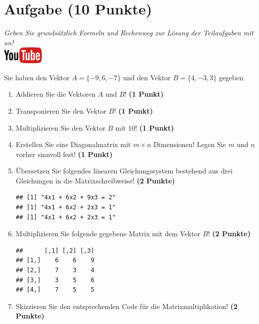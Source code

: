 \documentclass[a4paper, 10pt]{scrartcl}\usepackage[]{graphicx}\usepackage[]{xcolor}
\makeatletter
\newenvironment{kframe}{%
 \def\at@end@of@kframe{}%
 \ifinner\ifhmode%
  \def\at@end@of@kframe{\end{minipage}}%
  \begin{minipage}{\columnwidth}%
 \fi\fi%
 \def\FrameCommand##1{\hskip\@totalleftmargin \hskip-\fboxsep
 \colorbox{shadecolor}{##1}\hskip-\fboxsep
     \hskip-\linewidth \hskip-\@totalleftmargin \hskip\columnwidth}%
 \MakeFramed {\advance\hsize-\width
   \@totalleftmargin\z@ \linewidth\hsize
   \@setminipage}}%
 {\par\unskip\endMakeFramed%
 \at@end@of@kframe}
\newenvironment{knitrout}{}{} %
\makeatother
\begin{document}
  
\clearpage

\section{Aufgabe \hfill (10 Punkte)}

\textit{Geben Sie grunds{\"a}tzlich Formeln und Rechenweg zur L{\"o}sung der
  Teilaufgaben mit an!} \\[1Ex]

\hfill\href{https://youtu.be/x_MwWJoEsME}{\includegraphics[width =
  2cm]{img/youtube}} %
\hspace{2Ex}



Sie haben den Vektor $A = \{-9, 6, -7\}$ und den Vektor $B = \{4, -3, 3\}$ gegeben.

\begin{enumerate}
\item Addieren Sie die Vektoren $A$ und $B$! \textbf{(1 Punkt)}
\item Transponieren Sie den Vektor $B$!
  \textbf{(1 Punkt)} 
\item Multiplizieren Sie den Vektor $B$ mit
  $10$! \textbf{(1 Punkt)}
\item Erstellen Sie eine Diagonalmatrix mit $m \times n$ Dimensionen!
  Legen Sie $m$ und $n$ vorher sinnvoll fest! \textbf{(1 Punkt)}
\item {\"U}bersetzen Sie folgendes linearen Gleichungssystem bestehend aus drei
  Gleichungen in die Matrixschreibweise! \textbf{(2 Punkte)}
\begin{knitrout}
\color{fgcolor}\begin{kframe}
\begin{verbatim}
## [1] "4x1 + 6x2 + 9x3 = 2"
## [1] "4x1 + 6x2 + 2x3 = 1"
## [1] "4x1 + 6x2 + 2x3 = 1"
\end{verbatim}
\end{kframe}
\end{knitrout}
\item Multiplizieren Sie folgende gegebene Matrix mit dem Vektor $B$!
  \textbf{(2 Punkte)}
\begin{knitrout}
\color{fgcolor}\begin{kframe}
\begin{verbatim}
##      [,1] [,2] [,3]
## [1,]    6    6    9
## [2,]    7    3    4
## [3,]    3    5    6
## [4,]    7    5    5
\end{verbatim}
\end{kframe}
\end{knitrout}
\item Skizzieren Sie den entsprechenden \Rlogo Code f{\"u}r die
  Matrixmultiplikation! \textbf{(2 Punkte)}
\end{enumerate}
 
\end{document}
